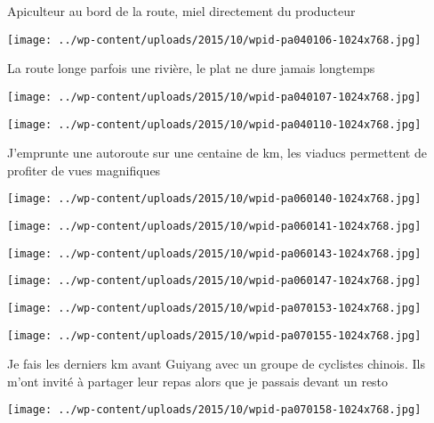  \newline
 Apiculteur au bord de la route, miel directement du producteur \newline
 \newline
\centerline{\texttt{[image: ../wp-content/uploads/2015/10/wpid-pa040106-1024x768.jpg]} } 
 \newline
 La route longe parfois une rivière, le plat ne dure jamais longtemps \newline
 \newline
\centerline{\texttt{[image: ../wp-content/uploads/2015/10/wpid-pa040107-1024x768.jpg]} } 
 \newline
 \newline
\centerline{\texttt{[image: ../wp-content/uploads/2015/10/wpid-pa040110-1024x768.jpg]} } 
 \newline
 J'emprunte une autoroute sur une centaine de km, les viaducs permettent de profiter de vues magnifiques \newline
 \newline
\centerline{\texttt{[image: ../wp-content/uploads/2015/10/wpid-pa060140-1024x768.jpg]} } 
 \newline
 \newline
\centerline{\texttt{[image: ../wp-content/uploads/2015/10/wpid-pa060141-1024x768.jpg]} } 
 \newline
 \newline
\centerline{\texttt{[image: ../wp-content/uploads/2015/10/wpid-pa060143-1024x768.jpg]} } 
 \newline
 \newline
\centerline{\texttt{[image: ../wp-content/uploads/2015/10/wpid-pa060147-1024x768.jpg]} } 
 \newline
 \newline
\centerline{\texttt{[image: ../wp-content/uploads/2015/10/wpid-pa070153-1024x768.jpg]} } 
 \newline
 \newline
\centerline{\texttt{[image: ../wp-content/uploads/2015/10/wpid-pa070155-1024x768.jpg]} } 
 \newline
 Je fais les derniers km avant Guiyang avec un groupe de cyclistes chinois. Ils m'ont invité à partager leur repas alors que je passais devant un resto \newline
 \newline
\centerline{\texttt{[image: ../wp-content/uploads/2015/10/wpid-pa070158-1024x768.jpg]} } 
